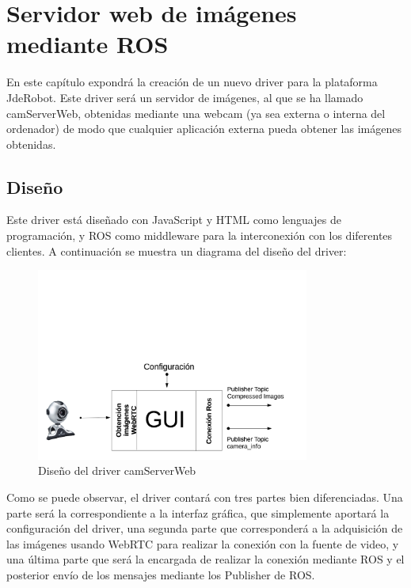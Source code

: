 \chapter{Servidor web de imágenes mediante ROS }\label{cap.camserver}
En este capítulo expondrá la creación de un nuevo driver para la plataforma JdeRobot. Este driver será un servidor de imágenes, al que se ha llamado camServerWeb, obtenidas mediante una webcam (ya sea externa o interna del ordenador) de modo que cualquier aplicación externa pueda obtener las imágenes obtenidas.
\section{Diseño}
Este driver está diseñado con JavaScript y HTML como lenguajes de programación, y ROS como middleware para la interconexión con los diferentes clientes. A continuación se muestra un diagrama del diseño del driver:
\begin{figure}[H]
  \begin{center}
    \includegraphics[width=0.8\textwidth]{figures/disenocamserver.png}
		\caption{Diseño del driver camServerWeb}
		\label{fig.diseñocamserver}
		\end{center}
\end{figure}
Como se puede observar, el driver contará con tres partes bien diferenciadas. Una parte será la correspondiente a la interfaz gráfica, que simplemente aportará la configuración del driver, una segunda parte que corresponderá a la adquisición de las imágenes usando WebRTC para realizar la conexión con la fuente de video, y una última parte que será la encargada de realizar la conexión mediante ROS y el posterior envío de los mensajes mediante los Publisher de ROS.

